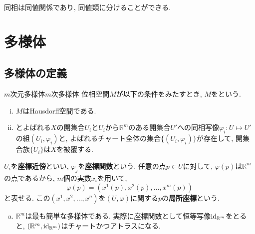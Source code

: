\documentclass[../main]{subfiles}
\begin{document}
        同相は同値関係であり, 同値類に分けることができる. 

\section{多様体}
    \subsection{多様体の定義}
        \begin{dfn}{$m$次元多様体}{$m$次多様体}
            位相空間$M$が以下の条件をみたすとき, $M$をという. 
            \begin{enumerate}[(i)]
                \item $M$はHausdorff空間である. 
                \item {}とよばれる$X$の開集合$U_i$と$U_i$から$\mathbb{R}^m$のある開集合$U'$への同相写像$\varphi_i: U \mapsto U'$の組$(U_i,\varphi_i)$と, よばれるチャート全体の集合$\{(U_i,\varphi_i)\}$が存在して, 開集合族$\{U_i\}$は$X$を被覆する. 
            \end{enumerate}
        \end{dfn}
        $U_i$を\textbf{座標近傍}といい,  $\varphi_j$を\textbf{座標関数}という. 
        任意の点$p \in U$に対して, $\varphi(p)$は$\mathbb{R}^m$の点であるから, $m$個の実数$x_i$を用いて, 
        \begin{equation}
            \varphi(p) = (x^1(p),x^2(p),\ldots,x^m(p))
        \end{equation}
        と表せる. この$(x^1,x^2,\ldots,x^n)$を$(U,\varphi)$に関する$p$の\textbf{局所座標}という. 
        
        \begin{exm}{}{}
            \begin{enumerate}[(a)]
                \item $\mathbb{R}^m$は最も簡単な多様体である. 実際に座標関数として恒等写像$\operatorname{id}_{\mathbb{R}^m}$をとると, $(\mathbb{R}^m, \operatorname{id}_{\mathbb{R}^m})$はチャートかつアトラスになる. 
            \end{enumerate}
        \end{exm}
        
\end{document}

